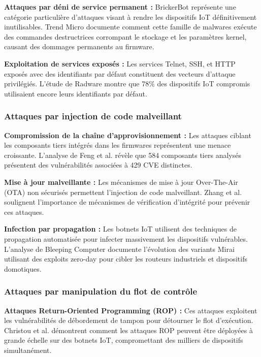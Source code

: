 \textbf{Attaques par déni de service permanent :} BrickerBot représente une catégorie particulière d'attaques visant à rendre les dispositifs IoT définitivement inutilisables. Trend Micro \cite{TrendMicro2024BrickerBot} documente comment cette famille de malwares exécute des commandes destructrices corrompant le stockage et les paramètres kernel, causant des dommages permanents au firmware.

\textbf{Exploitation de services exposés :} Les services Telnet, SSH, et HTTP exposés avec des identifiants par défaut constituent des vecteurs d'attaque privilégiés. L'étude de Radware \cite{Radware2024BrickerBot} montre que 78\% des dispositifs IoT compromis utilisaient encore leurs identifiants par défaut.

\subsubsection{Attaques par injection de code malveillant}

\textbf{Compromission de la chaîne d'approvisionnement :} Les attaques ciblant les composants tiers intégrés dans les firmwares représentent une menace croissante. L'analyse de Feng et al. \cite{Feng2022OneBadApple} révèle que 584 composants tiers analysés présentent des vulnérabilités associées à 429 CVE distinctes.

\textbf{Mise à jour malveillante :} Les mécanismes de mise à jour Over-The-Air (OTA) non sécurisés permettent l'injection de code malveillant. Zhang et al. \cite{Zhang2024RobustBlockchain} soulignent l'importance de mécanismes de vérification d'intégrité pour prévenir ces attaques.

\textbf{Infection par propagation :} Les botnets IoT utilisent des techniques de propagation automatisée pour infecter massivement les dispositifs vulnérables. L'analyse de Bleeping Computer \cite{BleepingComputer2024MiraiZeroDay} documente l'évolution des variants Mirai utilisant des exploits zero-day pour cibler les routeurs industriels et dispositifs domotiques.

\subsubsection{Attaques par manipulation du flot de contrôle}

\textbf{Attaques Return-Oriented Programming (ROP) :} Ces attaques exploitent les vulnérabilités de débordement de tampon pour détourner le flot d'exécution. Christou et al. \cite{Christou2024DAEDALUS} démontrent comment les attaques ROP peuvent être déployées à grande échelle sur des botnets IoT, compromettant des milliers de dispositifs simultanément.

